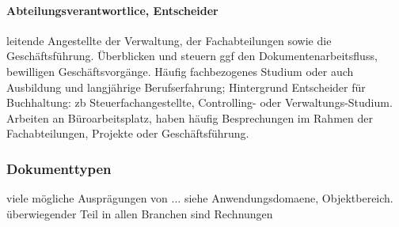 %
\paragraph*{Abteilungsverantwortlice, Entscheider}
leitende Angestellte der Verwaltung, der Fachabteilungen sowie die Geschäftsführung. Überblicken und steuern ggf den Dokumentenarbeitsfluss, bewilligen Geschäftsvorgänge. Häufig fachbezogenes Studium oder auch Ausbildung und langjährige Berufserfahrung; Hintergrund Entscheider für Buchhaltung: zb Steuerfachangestellte, Controlling- oder Verwaltungs-Studium. Arbeiten an Büroarbeitsplatz, haben häufig Besprechungen im Rahmen der Fachabteilungen, Projekte oder Geschäftsführung.


\subsubsection{Dokumenttypen}
viele mögliche Ausprägungen von ... siehe Anwendungsdomaene, Objektbereich. überwiegender Teil in allen Branchen sind Rechnungen

%